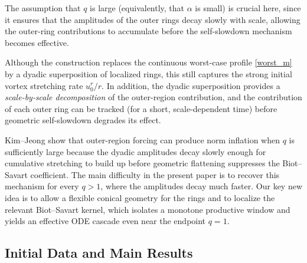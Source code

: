\documentclass[reqno,11pt]{amsart}
\begin{document}
The
assumption that $q$ is large (equivalently, that $\alpha$ is small) is crucial here,
since it ensures that the amplitudes of the outer rings decay slowly with scale, allowing
the outer-ring contributions to accumulate before the self-slowdown mechanism becomes
effective. 







Although the construction replaces the continuous worst-case profile \eqref{worst_m} by a
dyadic superposition of localized rings, this still captures the strong initial vortex stretching rate $u^r_0/r$.
 In addition, the dyadic superposition provides a \emph{scale-by-scale
decomposition} of the outer-region contribution, and the contribution of each outer ring can be tracked (for a short, scale-dependent
time) before geometric self-slowdown degrades its effect.

Kim–Jeong show that outer-region forcing can produce norm inflation when 
$q$ is sufficiently large because the dyadic amplitudes decay slowly enough for cumulative stretching to build up before geometric flattening suppresses the Biot--Savart coefficient. The main difficulty in the present paper is to recover this mechanism for every 
$q>1$, where the amplitudes decay much faster. Our key new idea is to allow a flexible conical geometry for the rings and to localize the relevant Biot--Savart kernel, which isolates a monotone productive window and yields an effective ODE cascade even near the endpoint 
$q=1$.




\subsection{Initial Data and Main Results}
\end{document}
